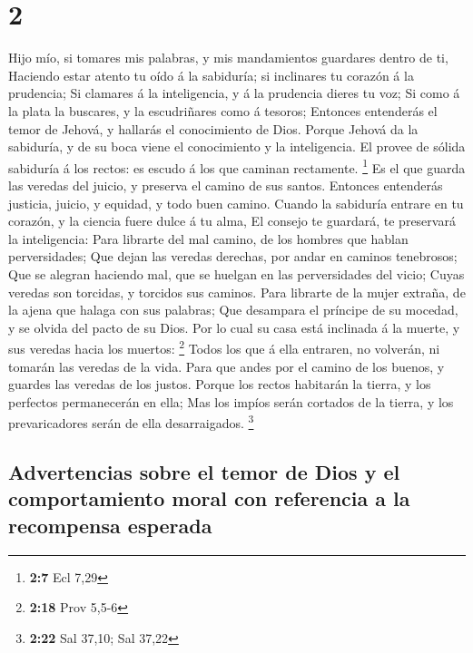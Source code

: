 \hypertarget{section-1}{%
\section{2}\label{section-1}}

 Hijo mío, si tomares mis palabras, y mis mandamientos
guardares dentro de ti,  Haciendo estar atento tu oído á
la sabiduría; si inclinares tu corazón á la prudencia;  Si
clamares á la inteligencia, y á la prudencia dieres tu voz;
 Si como á la plata la buscares, y la escudriñares como á
tesoros;  Entonces entenderás el temor de Jehová, y
hallarás el conocimiento de Dios.  Porque Jehová da la
sabiduría, y de su boca viene el conocimiento y la inteligencia.
 El provee de sólida sabiduría á los rectos: es escudo á
los que caminan rectamente. \footnote{\textbf{2:7} Ecl 7,29}
 Es el que guarda las veredas del juicio, y preserva el
camino de sus santos.  Entonces entenderás justicia,
juicio, y equidad, y todo buen camino.  Cuando la
sabiduría entrare en tu corazón, y la ciencia fuere dulce á tu alma,
 El consejo te guardará, te preservará la inteligencia:
 Para librarte del mal camino, de los hombres que hablan
perversidades;  Que dejan las veredas derechas, por andar
en caminos tenebrosos;  Que se alegran haciendo mal, que
se huelgan en las perversidades del vicio;  Cuyas veredas
son torcidas, y torcidos sus caminos.  Para librarte de
la mujer extraña, de la ajena que halaga con sus palabras;
 Que desampara el príncipe de su mocedad, y se olvida del
pacto de su Dios.  Por lo cual su casa está inclinada á
la muerte, y sus veredas hacia los muertos: \footnote{\textbf{2:18} Prov
  5,5-6}  Todos los que á ella entraren, no volverán, ni
tomarán las veredas de la vida.  Para que andes por el
camino de los buenos, y guardes las veredas de los justos.
 Porque los rectos habitarán la tierra, y los perfectos
permanecerán en ella;  Mas los impíos serán cortados de
la tierra, y los prevaricadores serán de ella desarraigados. \footnote{\textbf{2:22}
  Sal 37,10; Sal 37,22}

\hypertarget{advertencias-sobre-el-temor-de-dios-y-el-comportamiento-moral-con-referencia-a-la-recompensa-esperada}{%
\subsection{Advertencias sobre el temor de Dios y el comportamiento
moral con referencia a la recompensa
esperada}\label{advertencias-sobre-el-temor-de-dios-y-el-comportamiento-moral-con-referencia-a-la-recompensa-esperada}}

